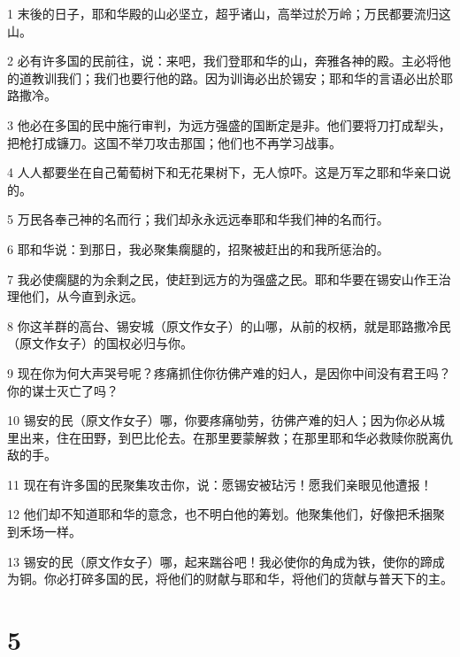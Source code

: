 \par 1 末後的日子，耶和华殿的山必坚立，超乎诸山，高举过於万岭；万民都要流归这山。
\par 2 必有许多国的民前往，说：来吧，我们登耶和华的山，奔雅各神的殿。主必将他的道教训我们；我们也要行他的路。因为训诲必出於锡安；耶和华的言语必出於耶路撒冷。
\par 3 他必在多国的民中施行审判，为远方强盛的国断定是非。他们要将刀打成犁头，把枪打成镰刀。这国不举刀攻击那国；他们也不再学习战事。
\par 4 人人都要坐在自己葡萄树下和无花果树下，无人惊吓。这是万军之耶和华亲口说的。
\par 5 万民各奉己神的名而行；我们却永永远远奉耶和华我们神的名而行。
\par 6 耶和华说：到那日，我必聚集瘸腿的，招聚被赶出的和我所惩治的。
\par 7 我必使瘸腿的为余剩之民，使赶到远方的为强盛之民。耶和华要在锡安山作王治理他们，从今直到永远。
\par 8 你这羊群的高台、锡安城（原文作女子）的山哪，从前的权柄，就是耶路撒冷民（原文作女子）的国权必归与你。
\par 9 现在你为何大声哭号呢？疼痛抓住你彷佛产难的妇人，是因你中间没有君王吗？你的谋士灭亡了吗？
\par 10 锡安的民（原文作女子）哪，你要疼痛劬劳，彷佛产难的妇人；因为你必从城里出来，住在田野，到巴比伦去。在那里要蒙解救；在那里耶和华必救赎你脱离仇敌的手。
\par 11 现在有许多国的民聚集攻击你，说：愿锡安被玷污！愿我们亲眼见他遭报！
\par 12 他们却不知道耶和华的意念，也不明白他的筹划。他聚集他们，好像把禾捆聚到禾场一样。
\par 13 锡安的民（原文作女子）哪，起来踹谷吧！我必使你的角成为铁，使你的蹄成为铜。你必打碎多国的民，将他们的财献与耶和华，将他们的货献与普天下的主。

\chapter{5}

